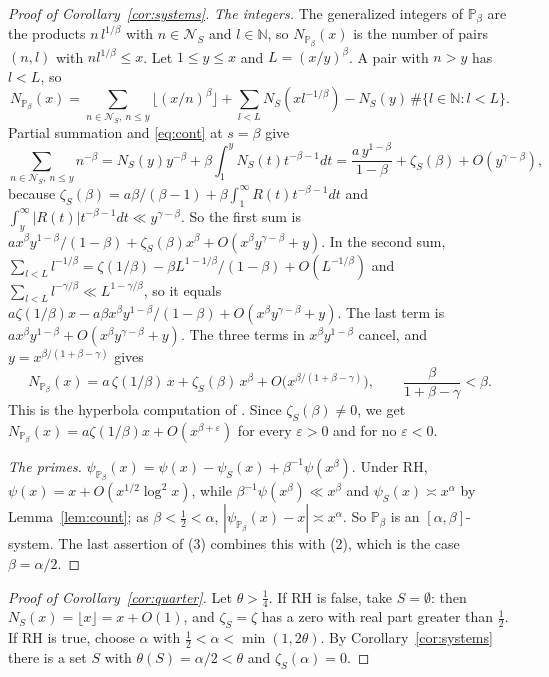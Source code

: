 \documentclass[11pt]{amsart}
\theoremstyle{remark}
\numberwithin{equation}{section}
\newcommand{\N}{\mathbb{N}}
\newcommand{\PP}{\mathbb{P}}
\newcommand{\cN}{\mathcal{N}}
\newcommand{\eps}{\varepsilon}
\begin{document}
\begin{proof}[Proof of Corollary~\ref{cor:systems}]
\emph{The integers.} The generalized integers of $\PP_\beta$ are the products $n\,l^{1/\beta}$ with $n\in\cN_S$ and $l\in\N$, so $N_{\PP_\beta}(x)$ is the number of pairs $(n,l)$ with $nl^{1/\beta}\le x$. Let $1\le y\le x$ and $L=(x/y)^{\beta}$. A pair with $n>y$ has $l<L$, so
\[
N_{\PP_\beta}(x)=\sum_{n\in\cN_S,\ n\le y}\bigl\lfloor(x/n)^{\beta}\bigr\rfloor+\sum_{l<L}N_S(xl^{-1/\beta})-N_S(y)\,\#\{l\in\N:l<L\}.
\]
Partial summation and \eqref{eq:cont} at $s=\beta$ give
\[
\sum_{n\in\cN_S,\ n\le y}n^{-\beta}=N_S(y)y^{-\beta}+\beta\int_1^yN_S(t)t^{-\beta-1}dt=\frac{a\,y^{1-\beta}}{1-\beta}+\zeta_S(\beta)+O(y^{\gamma-\beta}),
\]
because $\zeta_S(\beta)=a\beta/(\beta-1)+\beta\int_1^\infty R(t)t^{-\beta-1}dt$ and $\int_y^\infty|R(t)|t^{-\beta-1}dt\ll y^{\gamma-\beta}$. So the first sum is $ax^{\beta}y^{1-\beta}/(1-\beta)+\zeta_S(\beta)x^{\beta}+O(x^{\beta}y^{\gamma-\beta}+y)$. In the second sum, $\sum_{l<L}l^{-1/\beta}=\zeta(1/\beta)-\beta L^{1-1/\beta}/(1-\beta)+O(L^{-1/\beta})$ and $\sum_{l<L}l^{-\gamma/\beta}\ll L^{1-\gamma/\beta}$, so it equals $a\zeta(1/\beta)x-a\beta x^{\beta}y^{1-\beta}/(1-\beta)+O(x^{\beta}y^{\gamma-\beta}+y)$. The last term is $ax^{\beta}y^{1-\beta}+O(x^{\beta}y^{\gamma-\beta}+y)$. The three terms in $x^{\beta}y^{1-\beta}$ cancel, and $y=x^{\beta/(1+\beta-\gamma)}$ gives
\[
N_{\PP_\beta}(x)=a\,\zeta(1/\beta)\,x+\zeta_S(\beta)\,x^{\beta}+O\bigl(x^{\beta/(1+\beta-\gamma)}\bigr),\qquad \frac{\beta}{1+\beta-\gamma}<\beta .
\]
This is the hyperbola computation of \cite[Lemma~5.1]{BDR}. Since $\zeta_S(\beta)\ne0$, we get $N_{\PP_\beta}(x)=a\zeta(1/\beta)x+O(x^{\beta+\eps})$ for every $\eps>0$ and for no $\eps<0$.

\emph{The primes.} $\psi_{\PP_\beta}(x)=\psi(x)-\psi_S(x)+\beta^{-1}\psi(x^{\beta})$. Under RH, $\psi(x)=x+O(x^{1/2}\log^2x)$, while $\beta^{-1}\psi(x^{\beta})\ll x^{\beta}$ and $\psi_S(x)\asymp x^{\alpha}$ by Lemma~\ref{lem:count}; as $\beta<\tfrac12<\alpha$, $|\psi_{\PP_\beta}(x)-x|\asymp x^{\alpha}$. So $\PP_\beta$ is an $[\alpha,\beta]$-system. The last assertion of (3) combines this with (2), which is the case $\beta=\alpha/2$.
\end{proof}

\begin{proof}[Proof of Corollary~\ref{cor:quarter}]
Let $\theta>\tfrac14$. If RH is false, take $S=\emptyset$: then $N_S(x)=\lfloor x\rfloor=x+O(1)$, and $\zeta_S=\zeta$ has a zero with real part greater than $\tfrac12$. If RH is true, choose $\alpha$ with $\tfrac12<\alpha<\min(1,2\theta)$. By Corollary~\ref{cor:systems} there is a set $S$ with $\theta(S)=\alpha/2<\theta$ and $\zeta_S(\alpha)=0$.
\end{proof}
\end{document}
